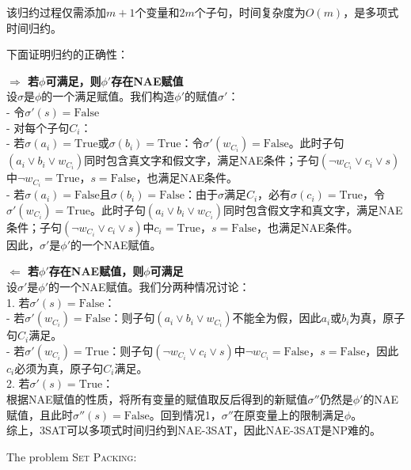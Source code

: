 \documentclass{article}
\newcounter{exercise}
\newcommand{\<}{
    \langle}
\renewcommand{\>}{
    \rangle}
\begin{document}
{\begin{enumerate}
    该归约过程仅需添加$m+1$个变量和$2m$个子句，时间复杂度为$O(m)$，是多项式时间归约。

    下面证明归约的正确性：

    \noindent\textbf{$\Rightarrow$ 若$\phi$可满足，则$\phi'$存在NAE赋值}\\
    设$\sigma$是$\phi$的一个满足赋值。我们构造$\phi'$的赋值$\sigma'$：\\
    - 令$\sigma'(s) = \text{False}$\\
    - 对每个子句$C_i$：\\
    - 若$\sigma(a_i) = \text{True}$或$\sigma(b_i) = \text{True}$：令$\sigma'(w_{C_i}) = \text{False}$。此时子句$(a_i \lor b_i \lor w_{C_i})$同时包含真文字和假文字，满足NAE条件；子句$(\neg w_{C_i} \lor c_i \lor s)$中$\neg w_{C_i} = \text{True}$，$s = \text{False}$，也满足NAE条件。\\
    - 若$\sigma(a_i) = \text{False}$且$\sigma(b_i) = \text{False}$：由于$\sigma$满足$C_i$，必有$\sigma(c_i) = \text{True}$，令$\sigma'(w_{C_i}) = \text{True}$。此时子句$(a_i \lor b_i \lor w_{C_i})$同时包含假文字和真文字，满足NAE条件；子句$(\neg w_{C_i} \lor c_i \lor s)$中$c_i = \text{True}$，$s = \text{False}$，也满足NAE条件。\\
    因此，$\sigma'$是$\phi'$的一个NAE赋值。

    \noindent\textbf{$\Leftarrow$ 若$\phi'$存在NAE赋值，则$\phi$可满足}\\
    设$\sigma'$是$\phi'$的一个NAE赋值。我们分两种情况讨论：\\
    1. 若$\sigma'(s) = \text{False}$：\\
    - 若$\sigma'(w_{C_i}) = \text{False}$：则子句$(a_i \lor b_i \lor w_{C_i})$不能全为假，因此$a_i$或$b_i$为真，原子句$C_i$满足。\\
    - 若$\sigma'(w_{C_i}) = \text{True}$：则子句$(\neg w_{C_i} \lor c_i \lor s)$中$\neg w_{C_i} = \text{False}$，$s = \text{False}$，因此$c_i$必须为真，原子句$C_i$满足。\\
    2. 若$\sigma'(s) = \text{True}$：\\
    根据NAE赋值的性质，将所有变量的赋值取反后得到的新赋值$\sigma''$仍然是$\phi'$的NAE赋值，且此时$\sigma''(s) = \text{False}$。回到情况1，$\sigma''$在原变量上的限制满足$\phi$。\\
    综上，3SAT可以多项式时间归约到NAE-3SAT，因此NAE-3SAT是NP难的。
\end{enumerate}

\begin{exercise}
 The problem \textsc{Set Packing}:


\end{exercise}}
\end{document}
